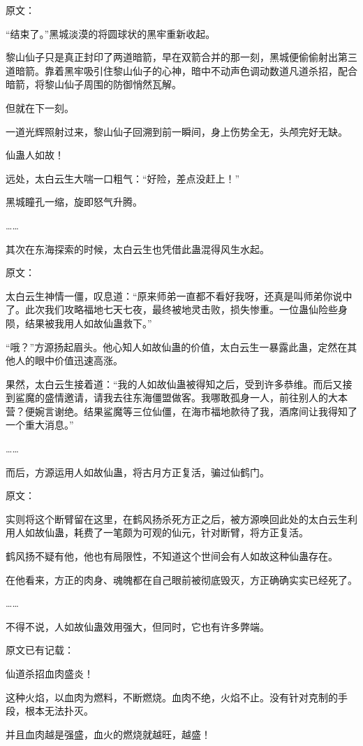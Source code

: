 \begin{this_body}
原文：

“结束了。”黑城淡漠的将圆球状的黑牢重新收起。

黎山仙子只是真正封印了两道暗箭，早在双箭合并的那一刻，黑城便偷偷射出第三道暗箭。靠着黑牢吸引住黎山仙子的心神，暗中不动声色调动数道凡道杀招，配合暗箭，将黎山仙子周围的防御悄然瓦解。

但就在下一刻。

一道光辉照射过来，黎山仙子回溯到前一瞬间，身上伤势全无，头颅完好无缺。

仙蛊人如故！

远处，太白云生大喘一口粗气：“好险，差点没赶上！”

黑城瞳孔一缩，旋即怒气升腾。

……

其次在东海探索的时候，太白云生也凭借此蛊混得风生水起。

原文：

太白云生神情一僵，叹息道：“原来师弟一直都不看好我呀，还真是叫师弟你说中了。此次我们攻略福地七天七夜，最终被地灵击败，损失惨重。一位蛊仙险些身陨，结果被我用人如故仙蛊救下。”

“哦？”方源扬起眉头。他心知人如故仙蛊的价值，太白云生一暴露此蛊，定然在其他人的眼中价值迅速高涨。

果然，太白云生接着道：“我的人如故仙蛊被得知之后，受到许多恭维。而后又接到鲨魔的盛情邀请，请我去往东海僵盟做客。我哪敢孤身一人，前往别人的大本营？便婉言谢绝。结果鲨魔等三位仙僵，在海市福地款待了我，酒席间让我得知了一个重大消息。”

……

而后，方源运用人如故仙蛊，将古月方正复活，骗过仙鹤门。

原文：

实则将这个断臂留在这里，在鹤风扬杀死方正之后，被方源唤回此处的太白云生利用人如故仙蛊，耗费了一笔颇为可观的仙元，针对断臂，将方正复活。

鹤风扬不疑有他，他也有局限性，不知道这个世间会有人如故这种仙蛊存在。

在他看来，方正的肉身、魂魄都在自己眼前被彻底毁灭，方正确确实实已经死了。

……

不得不说，人如故仙蛊效用强大，但同时，它也有许多弊端。

原文已有记载：

仙道杀招血肉盛炎！

这种火焰，以血肉为燃料，不断燃烧。血肉不绝，火焰不止。没有针对克制的手段，根本无法扑灭。

并且血肉越是强盛，血火的燃烧就越旺，越盛！


\end{this_body}
